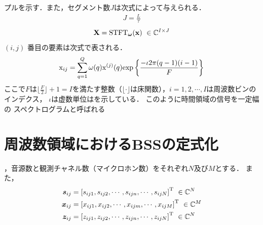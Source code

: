 プルを示す．また，セグメント数$J$は次式によって与えられる．
\begin{align}
    J = \frac{L}{\tau}
\end{align}
\begin{align}
\textcolor{black}{\mathbf{X}}= {\rm STFT}_{\bm{\omega}}(\textcolor{black}{\mathbf{x}})~\in \mathbb{C}^{I \times J}
\end{align}
$(i, j)$ 番目の要素は次式で表される．
\begin{align}
    \textcolor{black}{\mathrm{x}}_{ij}= \sum_{q=1}^{Q}\omega(q) \textcolor{black}{\mathrm{x}}^{(j)}(q){\rm exp}\left\{\frac{-\iota2\pi(q-1)(i-1)}{F}\right\}
\end{align}
ここで$F$は$\lfloor \frac{F}{2}\rfloor+1 =I$を満たす整数（$\lfloor \cdot \rfloor$は床関数），$i= 1, 2, \cdots , I$は周波数ビンのインデクス，
$\iota$は虚数単位はを示している．
このように時間領域の信号を一定幅の
スペクトログラムと呼ばれる


\section{周波数領域におけるBSSの定式化}
\label{sec:formularization}
，音源数と観測チャネル数（マイクロホン数）をそれぞれ$N$及び$M$とする．
また，
\begin{align}
  \bm{s}_{ij} &= \left[
	s_{ij\textcolor{black}{1}},s_{ij\textcolor{black}{2}}, \cdots, s_{ij\textcolor{black}{n}}, \cdots, s_{ij\textcolor{black}{N}} 
  \right]^\mathrm{T}~\in \mathbb{C}^{N} \label{f:BSS_s}\\
  \bm{x}_{ij} &= \left[
      x_{ij\textcolor{black}{1}},x_{ij\textcolor{black}{2}},  \cdots, x_{ij\textcolor{black}{m}}, \cdots  , x_{ij\textcolor{black}{M}} 
  \right]^\mathrm{T}~\in \mathbb{C}^{M}  \label{f:BSS_x}\\
  \bm{z}_{ij} &= \left[
      z_{ij\textcolor{black}{1}},z_{ij\textcolor{black}{2}},  \cdots, z_{ij\textcolor{black}{n}}, \cdots  , z_{ij\textcolor{black}{N}} 
  \right]^\mathrm{T}~\in \mathbb{C}^{N} \label{f:BSS_z}
\end{align}


